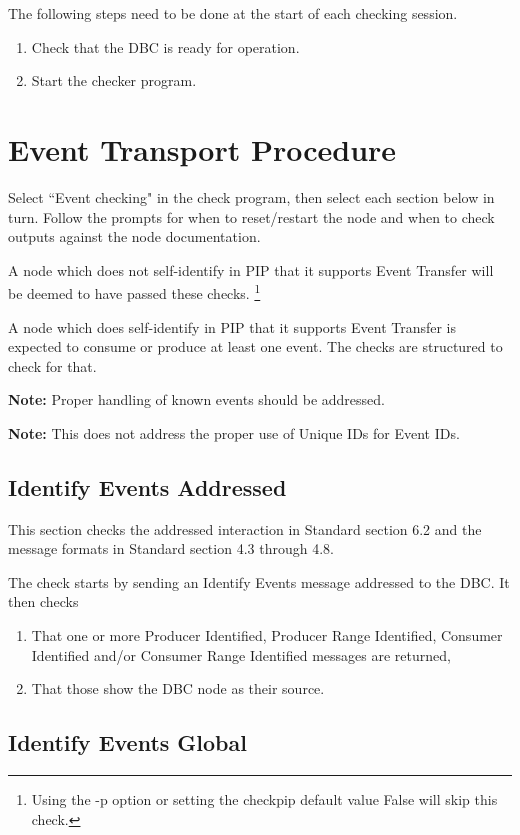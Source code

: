 \documentclass[11pt]{article}
\begin{document}
The following steps need to be done at the start of each checking session.
\begin{enumerate}
\item Check that the DBC is ready for operation.
\item Start the checker program.
\end{enumerate}

\section{Event Transport Procedure}

Select ``Event checking" in the check program, 
then select each section below in turn.  Follow the prompts
for when to reset/restart the node and when to check 
outputs against the node documentation.

A node which does not self-identify in PIP that it supports
Event Transfer will be deemed to have passed these checks.
\footnote{Using the -p option or setting the checkpip default value False will skip this check.}

A node which does self-identify in PIP that it supports 
Event Transfer is expected to consume or produce at least 
one event.  The checks are structured to check for that.

\textbf{Note:}  Proper handling of known events should be addressed.

\textbf{Note:}  This does not address the proper use of Unique IDs for Event IDs.

\subsection{Identify Events Addressed}

This section checks the addressed interaction in Standard section 6.2 and
the message formats in Standard section 4.3 through 4.8.

The check starts by sending an Identify Events message addressed to the DBC.
It then checks

\begin{enumerate}
\item That one or more Producer Identified, Producer Range Identified, 
        Consumer Identified and/or Consumer Range Identified messages are returned,
\item That those show the DBC node as their source.
\end{enumerate}

\subsection{Identify Events Global}
\end{document}
